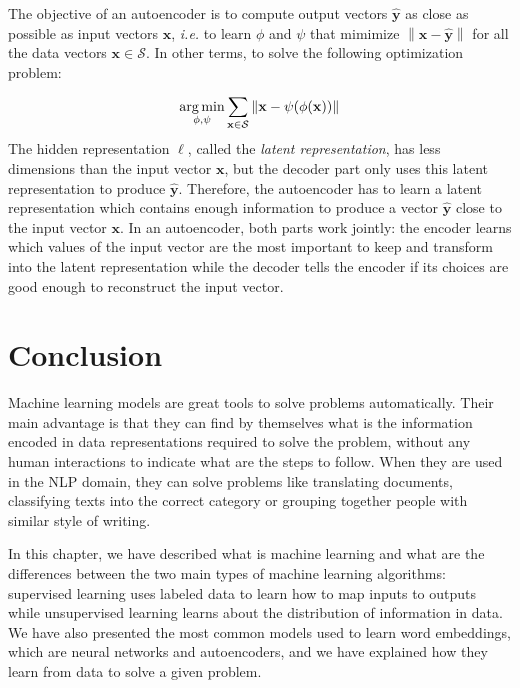     The objective of an autoencoder is to compute output vectors
    $\mathbf{\hat{y}}$ as close as possible as input vectors $\mathbf{x}$,
    \textit{i.e.} to learn $\phi$ and $\psi$ that mimimize $\left\lVert
    \mathbf{x} - \mathbf{\hat{y}} \right\rVert$ for all the data vectors
    $\mathbf{x} \in \mathcal{S}$. In other terms, to solve the following
    optimization problem:

    \begin{equation}
      \operatorname*{arg\,min}_{\phi, \psi} \sum_{\mathbf{x} \in \mathcal{S}}
                    \left\lVert \mathbf{x} - \psi(\phi(\mathbf{x})) \right\rVert
    \end{equation}
    The hidden representation $\ell$, called the \textit{latent representation},
    has less dimensions than the input vector $\mathbf{x}$, but the decoder part
    only uses this latent representation to produce $\mathbf{\hat{y}}$.
    Therefore, the autoencoder has to learn a latent representation which
    contains enough information to produce a vector $\mathbf{\hat{y}}$ close to
    the input vector $\mathbf{x}$. In an autoencoder, both parts work jointly:
    the encoder learns which values of the input vector are the most important
    to keep and transform into the latent representation while the decoder tells
    the encoder if its choices are good enough to reconstruct the input vector.

\section{Conclusion}
  Machine learning models are great tools to solve problems automatically.
  Their main advantage is that they can find by themselves what is the
  information encoded in data representations required to solve the problem,
  without any human interactions to indicate what are the steps to follow. When
  they are used in the NLP domain, they can solve problems like translating
  documents, classifying texts into the correct category or grouping together
  people with similar style of writing. \medskip

  In this chapter, we have described what is machine learning and what are the
  differences between the two main types of machine learning algorithms:
  supervised learning uses labeled data to learn how to map inputs to outputs
  while unsupervised learning learns about the distribution of information in
  data. We have also presented the most common models used to learn word
  embeddings, which are neural networks and autoencoders, and we have explained
  how they learn from data to solve a given problem. \medskip

